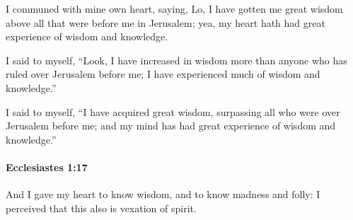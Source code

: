 			\begin{versebox}
					\item[BHS] 
					\item[LXX] 
					\item[ASV] I communed with mine own heart, saying, Lo, I have gotten me great wisdom above all that were before me in Jerusalem; yea, my heart hath had great experience of wisdom and knowledge.
					\item[NIV] I said to myself, “Look, I have increased in wisdom more than anyone who has ruled over Jerusalem before me; I have experienced much of wisdom and knowledge.”
					\item[NRSV] I said to myself, “I have acquired great wisdom, surpassing all who were over Jerusalem before me; and my mind has had great experience of wisdom and knowledge.”
			\end{versebox}

		\paragraph{Ecclesiastes 1:17} %
			\label{ECCLESIASTES-1-17}

			And I gave my heart to know wisdom, and to know madness and folly: I perceived that this also is vexation of spirit.

